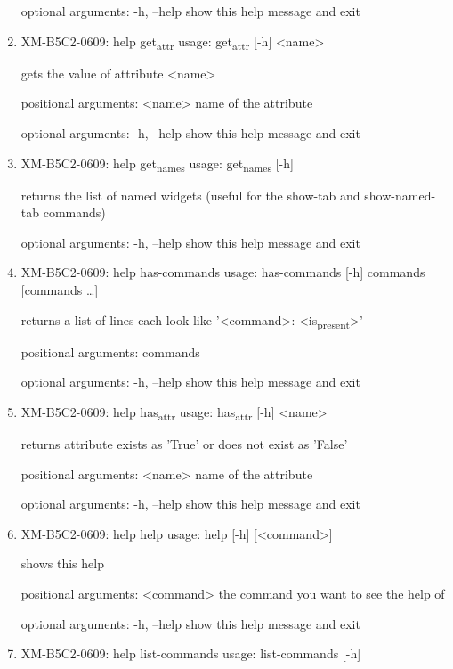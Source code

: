 \documentclass[11pt]{article}
\begin{document}
\begin{enumerate}
optional arguments:
  -h, --help  show this help message and exit

\item XM-B5C2-0609: help get\textsubscript{attr}
\label{sec:orgeb83d28}
usage: get\textsubscript{attr} [-h] <name>

gets the value of attribute <name>

positional arguments:
  <name>      name of the attribute

optional arguments:
  -h, --help  show this help message and exit

\item XM-B5C2-0609: help get\textsubscript{names}
\label{sec:org924b5bd}
usage: get\textsubscript{names} [-h]

returns the list of named widgets (useful for the show-tab and show-named-tab
commands)

optional arguments:
  -h, --help  show this help message and exit

\item XM-B5C2-0609: help has-commands
\label{sec:org94e4608}
usage: has-commands [-h] commands [commands \ldots{}]

returns a list of lines each look like '<command>: <is\textsubscript{present}>'

positional arguments:
  commands

optional arguments:
  -h, --help  show this help message and exit

\item XM-B5C2-0609: help has\textsubscript{attr}
\label{sec:org0d65979}
usage: has\textsubscript{attr} [-h] <name>

returns attribute exists as 'True' or does not exist as 'False'

positional arguments:
  <name>      name of the attribute

optional arguments:
  -h, --help  show this help message and exit

\item XM-B5C2-0609: help help
\label{sec:orgcccc9a1}
usage: help [-h] [<command>]

shows this help

positional arguments:
  <command>   the command you want to see the help of

optional arguments:
  -h, --help  show this help message and exit

\item XM-B5C2-0609: help list-commands
\label{sec:orgf562ae4}
usage: list-commands [-h]


\end{enumerate}
\end{document}
